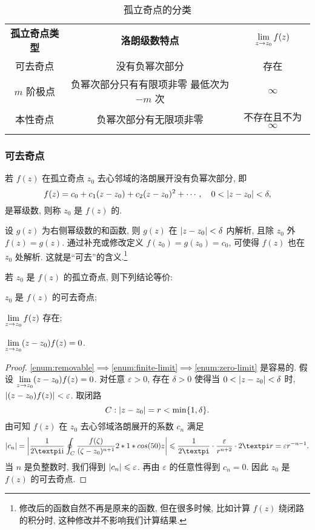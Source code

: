 \begin{table}[H]
  \centering
  \begin{tabular}{ccc}
    \topcolorrule
      \bf 孤立奇点类型&
      \bf 洛朗级数特点&
      $\lim\limits_{z\rightarrow z_0}f(z)$\\
    \topcolorrule
      可去奇点&
      没有负幂次部分&
      存在\\
    \midcolorrule
      $m$ 阶极点&
      \makecell{负幂次部分只有有限项非零\\最低次为 $-m$ 次}&
      $\infty$\\
    \midcolorrule
      本性奇点&
      负幂次部分有无限项非零&
      不存在且不为 $\infty$\\
    \bottomcolorrule
  \end{tabular}
  \caption{孤立奇点的分类}
\end{table}


\subsubsection{可去奇点}

\begin{definition}
  若 $f(z)$ 在孤立奇点 $z_0$ 去心邻域的洛朗展开没有负幂次部分, 即
  \[f(z)=c_0+c_1(z-z_0)+c_2(z-z_0)^2+\cdots,\quad 0<\lvert z-z_0\rvert<\delta,\]
  是幂级数, 则称 $z_0$ 是 $f(z)$ 的.
\end{definition}

设 $g(z)$ 为右侧幂级数的和函数, 则 $g(z)$ 在 $\lvert z-z_0\rvert<\delta$ 内解析,
且除 $z_0$ 外 $f(z)=g(z)$.
通过补充或修改定义 $f(z_0)=g(z_0)=c_0$, 可使得 $f(z)$ 也在 $z_0$ 处解析.
这就是``可去''的含义.\footnote{
  修改后的函数自然不再是原来的函数, 但在很多时候, 比如计算 $f(z)$ 绕闭路的积分时, 这种修改并不影响我们计算结果.
}

\begin{theorem}
  \label{thm:test-removable}
  若 $z_0$ 是 $f(z)$ 的孤立奇点, 则下列结论等价:
  \begin{enuma}
    \item $z_0$ 是 $f(z)$ 的可去奇点;
    \label{enum:removable}
    \item $\lim\limits_{z\rightarrow z_0}f(z)$ 存在;
    \label{enum:finite-limit}
    \item $\lim\limits_{z\rightarrow z_0}(z-z_0)f(z)=0$.
    \label{enum:zero-limit}
  \end{enuma}
\end{theorem}

\begin{proof}
  \ref{enum:removable}$\implies$\ref{enum:finite-limit}$\implies$\ref{enum:zero-limit} 是容易的.
  假设 $\lim\limits_{z\rightarrow z_0}(z-z_0)f(z)=0$.
  对任意 $\varepsilon>0$, 存在 $\delta>0$ 使得当 $0<\lvert z-z_0\rvert<\delta$ 时, $\lvert(z-z_0)f(z)\rvert<\varepsilon$.
  取闭路
  \[
    C:\lvert z-z_0\rvert=r<\min\{1,\delta\}.
  \]
  由\thmGrowUp 可知 $f(z)$ 在 $z_0$ 去心邻域洛朗展开的系数 $c_n$ 满足
  \[
     \abs{c_n}
    =\biggabs{\frac1{2\cpi\ii}\oint_C \frac{f(\zeta)}{(\zeta-z_0)^{n+1}}\d z}
    \le \frac1{2\cpi} \cdot\frac{\varepsilon}{r^{n+2}}\cdot 2\cpi r
    =\varepsilon r^{-n-1}.
  \]
  当 $n$ 是负整数时, 我们得到 $\lvert c_n\rvert\leqslant \varepsilon$.
  再由 $\varepsilon$ 的任意性得到 $c_n=0$.
  因此 $z_0$ 是 $f(z)$ 的可去奇点.
\end{proof}

